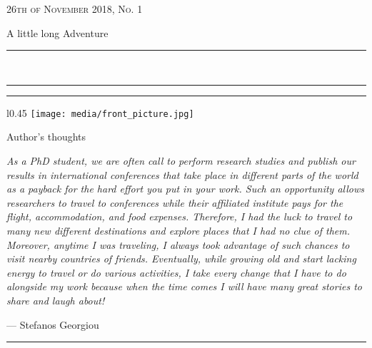\documentclass[10pt,a4paper]{article} %
\newcommand{\HorRule}[1]{\noindent\rule{\linewidth}{#1}} %
\newcommand{\SepRule}{\noindent	%
\begin{center}
\rule{250pt}{1pt} %
\end{center}
}
\newcommand{\NewsletterName}[1]{ %
\begin{center}
\Huge \usefont{T1}{fvs}{b}{n} %
#1
\end{center}	
\par \normalsize \normalfont}
\newcommand{\JournalIssue}[1]{ %
\hfill \textsc{26th of November 2018, No. #1} %
\par \normalsize \normalfont}
\newcommand{\NewsItem}[1]{ %
\usefont{T1}{fvs}{n}{n} %
\vspace{24pt}\large #1\vspace{3pt} %
\par \normalsize \normalfont}
\begin{document}
\JournalIssue{1} %

\NewsletterName{A little long Adventure} %

\noindent\HorRule{3pt} \\[-0.75\baselineskip] %
\HorRule{1pt} %


\vspace{0.5cm}
\SepRule
\vspace{-0.5cm}

\begin{center}
\begin{minipage}[h]{0.75 \linewidth}
\begin{wrapfigure}{l}{0.45 \textwidth}
	\texttt{[image: media/front\_picture.jpg]} \\
\end{wrapfigure}
	
\NewsItem{Author's thoughts} %
\vspace{3pt} %
\textit{
As a PhD student, we are often call to perform research studies and publish our
results in international conferences that take place in different parts of the world
as a payback for the hard effort you put in your work.
Such an opportunity allows researchers to travel to conferences while their
affiliated institute pays for the flight, accommodation, and food expenses. 
Therefore, I had the luck to travel to many new different destinations
and explore places that I had no clue of them.
Moreover, anytime I was traveling, I always took advantage of such chances
to visit nearby countries of friends.
Eventually, while growing old and start lacking energy to travel or do various activities,
I take every change that I have to do alongside my work because when the time comes
I will have many great stories to share and laugh about!
}
\par\hfill --- Stefanos Georgiou
\end{minipage}
\end{center}

\vspace{0.5cm}
\SepRule %
\vspace{0.5cm}
\end{document}
